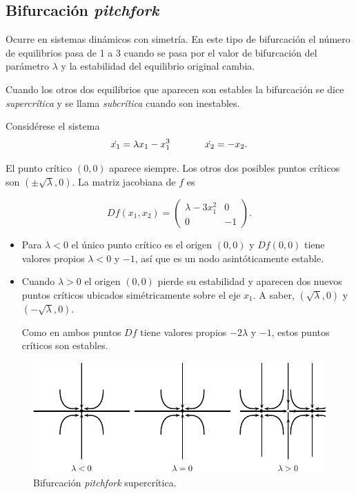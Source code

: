 \newpage %

\subsection{Bifurcación \textit{pitchfork}}

Ocurre en sistemas dinámicos con simetría. En este tipo de bifurcación el número de equilibrios pasa de 1 a 3 cuando se pasa por el valor de bifurcación del parámetro $\lambda$ y la estabilidad del equilibrio original cambia.

Cuando los otros dos equilibrios que aparecen son estables la bifurcación se dice \emph{supercrítica} y se llama \emph{subcrítica} cuando son inestables.

\begin{example}
Considérese el sistema
$$ 
	\dot{x_1} = \lambda x_1 - x_1^3 \hspace{0.5in} \dot{x_2} = -x_2.
$$

El punto crítico $(0,0)$ aparece siempre. Los otros dos posibles puntos críticos son $(\pm \sqrt{\lambda}, 0)$.
La matriz jacobiana de $f$ es

$$
	Df(x_1,x_2) = \left( \begin{array}{ll}
		\lambda - 3x_1^2 & 0 \\
		0 & -1
	\end{array} \right).
$$

\begin{itemize}
	\item Para $\lambda < 0$ el único punto crítico es el origen $(0,0)$ y $Df(0,0)$ tiene valores propios $\lambda < 0$ y $-1$, así que es un nodo asintóticamente estable.
	\item Cuando $\lambda > 0$ el origen $(0,0)$ pierde su estabilidad y aparecen dos nuevos puntos críticos ubicados simétricamente sobre el eje $x_1$. A saber, $(\sqrt{\lambda}, 0)$ y $(-\sqrt{\lambda}, 0)$. 

Como en ambos puntos $Df$ tiene valores propios $-2\lambda$ y $-1$, estos puntos críticos son estables.
\end{itemize}

\begin{figure}[ht] \centering
    \includegraphics[scale=1.0]{figures/bifurcations-pitchforksupercritical.pdf} 
    \caption{Bifurcación \textit{pitchfork} supercrítica.}
\end{figure}

\end{example}

